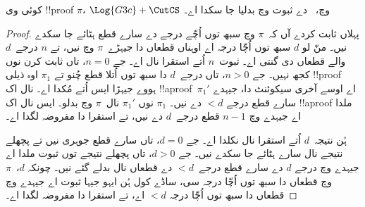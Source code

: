 \documentclass[../../../include/open-logic-section]{subfiles}
\begin{document}
\begin{thm}
کوئی وی !!{proof} $\pi$، $\Log{G3c} + \CutCS$ وچ،~ دے ثبوت وچ بدلیا جا سکدا اے۔
\end{thm}

\begin{proof}
پہلاں ثابت کردے آں کہ~$\pi$ وچ سبھ توں اُچّے درجے دے سارے قطع ہٹائے جا سکدے نیں۔ منّ لو $d$ سبھ توں اُچّا درجہ اے اوہناں قطعاں دا جیہڑے~$\pi$ وچ نیں، تے $n$ درجے~$d$ والے قطعاں دی گنتی اے۔ ثبوت~$n$ اُتے استقرا نال اے۔ جے $n=0$، تاں ثابت کرن نوں کجھ نہیں۔ جے $n>0$، تاں درجے~$d$ دا سبھ توں اُتلا قطع چُنو تے $\pi_1$ اوہ ذیلی !!{proof} ہووے جیہڑا ایس اُتے مُکدا اے۔  نال اک !!a{proof}~$\pi_1'$ اے اوسے آخری سیکوئنٹ دا، جیہدے سارے قطع درجے $<d$ دے نیں۔ $\pi_1$ نوں $\pi_1'$ نال~$\pi$ وچ بدلو۔ ایس نال اک !!a{proof} ملدا اے جیہدے وچ $n-1$ قطع درجے~$d$ دے نیں، تے استقرا دا مفروضہ لگدا اے۔

ہُن نتیجہ~$d$ اُتے استقرا نال نکلدا اے۔ جے $d=0$، تاں سارے قطع جوہری نیں تے پچھلے نتیجے نال سارے ہٹائے جا سکدے نیں۔ جے $d>0$، تاں پچھلے نتیجے توں ثبوت ملدا اے جیہدے وچ درجے $d$ دے سارے قطع درجے~$<d$ دے قطعاں نال بدلے گئے نیں۔ چونکہ $d$،~$\pi$ وچ قطعاں دا سبھ توں اُچّا درجہ سی، ساڈے کول ہُن ایہو جیہا ثبوت اے جیہدے وچ قطعاں دا سبھ توں اُچّا درجہ $<d$ اے، تے استقرا دا مفروضہ لگدا اے۔
\end{proof}
\end{document}
